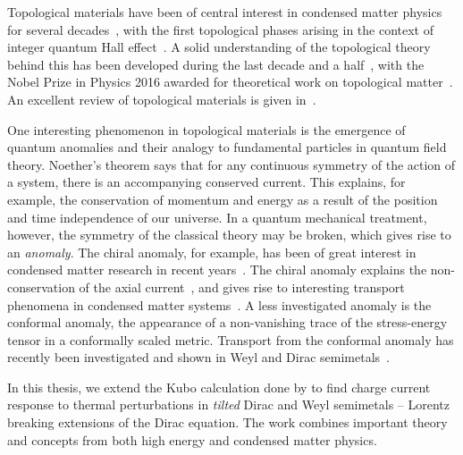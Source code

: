 %
Topological materials have been of central interest in condensed matter physics for several decades~\cite{fruchartIntroductionTopologicalInsulators2013}, with the first topological phases arising in the context of integer quantum Hall effect~\cites{klitzingNewMethodHighAccuracy1980}[as cited in][]{fruchartIntroductionTopologicalInsulators2013}.
A solid understanding of the topological theory behind this has been developed during the last decade and a half~\cite{fruchartIntroductionTopologicalInsulators2013, bernevigTopologicalInsulatorsTopological2013}, with the Nobel Prize in Physics 2016 awarded for theoretical work on topological matter~\cite{royalswedishacademyofsciencesNobelPrizePhysics}.
An excellent review of topological materials is given in~\cite{fruchartIntroductionTopologicalInsulators2013}.

One interesting phenomenon in topological materials is the emergence of quantum anomalies and their analogy to fundamental particles in quantum field theory.
Noether's theorem says that for any continuous symmetry of the action of a system, there is an accompanying conserved current.
This explains, for example, the conservation of momentum and energy as a result of the position and time independence of our universe.
In a quantum mechanical treatment, however, the symmetry of the classical theory may be broken, which gives rise to an \emph{anomaly}.
The chiral anomaly, for example, has been of great interest in condensed matter research in recent years~\cite{arjonaFingerprintsConformalAnomaly2019}.
The chiral anomaly explains the non-conservation of the axial current~\cite{zeeQuantumFieldTheory2010}, and gives rise to interesting transport phenomena in condensed matter systems~\cite{burkovChiralAnomalyTransport2015, wehlingDiracMaterials2014, burkovTopologicalSemimetals2016}.
A less investigated anomaly is the conformal anomaly, the appearance of a non-vanishing trace of the stress-energy tensor in a conformally scaled metric.
Transport from the conformal anomaly has recently been investigated and shown in Weyl and Dirac semimetals~\cite{chernodubAnomalousTransportDue2016, chernodubGenerationNernstCurrent2018, arjonaFingerprintsConformalAnomaly2019}.

In this thesis, we extend the Kubo calculation done by \textcite{arjonaFingerprintsConformalAnomaly2019} to find charge current response to thermal perturbations in \emph{tilted} Dirac and Weyl semimetals -- Lorentz breaking extensions of the Dirac equation.
The work combines important theory and concepts from both high energy and condensed matter physics.

